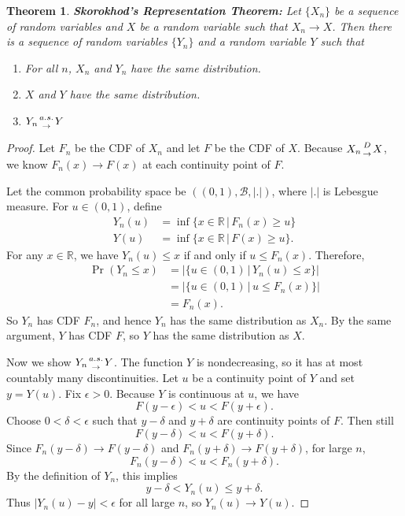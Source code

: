 \documentclass{article}
\newtheorem{theorem}{Theorem}
\theoremstyle{definition}\newtheorem{definition}{DEF}
\theoremstyle{definition}\newtheorem{example}{Ex}
\theoremstyle{lemma}\newtheorem{lemma}{Lemma}
\theoremstyle{corrolary}\newtheorem{corrolary}{Cor}
\begin{document}
\begin{theorem}
\textbf{Skorokhod’s Representation Theorem:}
Let $\{X_n\}$ be a sequence of random variables and $X$ be a random variable such that $X_n \rightarrow X$.
Then there is a sequence of random variables $\{Y_n\}$ and a random variable $Y$ such that
\begin{enumerate}
\item For all $n$, $X_n$ and $Y_n$ have the same distribution.
\item $X$ and $Y$ have the same distribution.
\item $Y_n {a.s. \atop \rightarrow} Y$
\end{enumerate}
\end{theorem}
\begin{proof}
Let $F_n$ be the CDF of $X_n$ and let $F$ be the CDF of $X$.
Because $X_n {D \atop \rightarrow} X$, we know $F_n(x)\rightarrow F(x)$ at each continuity point of $F$.

Let the common probability space be $((0,1),\mathcal{B},|.|)$, where $|.|$ is Lebesgue measure.
For $u\in (0,1)$, define
\begin{align*}
Y_n(u)&=\inf\{x\in \mathbb{R}\, |\, F_n(x)\geq u\}\\
Y(u)&=\inf\{x\in \mathbb{R}\, |\, F(x)\geq u\}.
\end{align*}
For any $x\in \mathbb{R}$, we have $Y_n(u)\leq x$ if and only if $u\leq F_n(x)$.
Therefore,
\begin{align*}
\Pr\left( Y_n \leq x \right)
 &= |\{u\in (0,1)\, |\, Y_n(u)\leq x\}|\\
&=|\{u\in (0,1)\, |\, u\leq F_n(x)\}|\\
&=F_n(x).
\end{align*}
So $Y_n$ has CDF $F_n$, and hence $Y_n$ has the same distribution as $X_n$.
By the same argument, $Y$ has CDF $F$, so $Y$ has the same distribution as $X$.

Now we show $Y_n {a.s. \atop \rightarrow} Y$.
The function $Y$ is nondecreasing, so it has at most countably many discontinuities.
Let $u$ be a continuity point of $Y$ and set $y=Y(u)$.
Fix $\epsilon >0$.
Because $Y$ is continuous at $u$, we have
\begin{equation*}
F(y-\epsilon)<u<F(y+\epsilon).
\end{equation*}
Choose $0<\delta<\epsilon$ such that $y-\delta$ and $y+\delta$ are continuity points of $F$.
Then still
\begin{equation*}
F(y-\delta)<u<F(y+\delta).
\end{equation*}
Since $F_n(y-\delta)\rightarrow F(y-\delta)$ and $F_n(y+\delta)\rightarrow F(y+\delta)$, for large $n$,
\begin{equation*}
F_n(y-\delta)<u<F_n(y+\delta).
\end{equation*}
By the definition of $Y_n$, this implies
\begin{equation*}
y-\delta<Y_n(u)\leq y+\delta.
\end{equation*}
Thus $|Y_n(u)-y|<\epsilon$ for all large $n$, so $Y_n(u)\rightarrow Y(u)$.


\end{proof}
\end{document}
